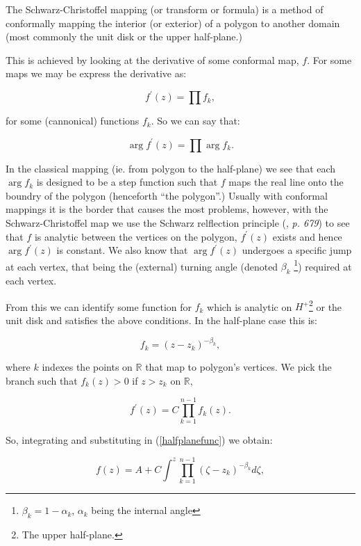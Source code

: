 \documentclass[a4paper,10pt]{amsart}
\newcommand{\sch}{Schwarz-Christoffel }
\newcommand{\fprime}{f^\prime(z)}
\begin{document}
The \sch mapping (or transform or formula) is a method of conformally mapping the interior (or exterior) of a polygon to another domain (most commonly the unit disk or the upper half-plane.)

This is achieved by looking at the derivative of some conformal map, $f$. For some maps we may be express the derivative as:

\begin{equation}
\fprime = \prod f_k,
\end{equation}

for some (cannonical) functions $f_k$. So we can say that:

\begin{equation}
\arg \fprime = \prod \arg f_k.
\end{equation}

In the classical mapping (ie. from polygon to the half-plane) we see that each $\arg f_k$ is designed to be a step function such that $f$ maps the real line onto the boundry of the polygon (henceforth ``the polygon''.) Usually with conformal mappings it is the border that causes the most problems, however, with the \sch map we use the Schwarz relflection principle (\cite{handbuch}, \emph{p. 679}) to see that $f$ is analytic between the vertices on the polygon, $\fprime$ exists and hence $\arg \fprime$ is constant. We also know that $\arg \fprime$ undergoes a specific jump at each vertex, that being the (external) turning angle (denoted $\beta_k$ \footnote{$\beta_k = 1-\alpha_k$, $\alpha_k$ being the internal angle}) required at each vertex. 

From this we can identify some function for $f_k$ which is analytic on $H^+$\footnote{The upper half-plane.} or the unit disk and satisfies the above conditions. In the half-plane case this is:

\begin{equation}
\label{halfplanefunc}
f_k = (z-z_k)^{-\beta_k},
\end{equation}

where $k$ indexes the points on $\mathbb{R}$ that map to polygon's vertices. We pick the branch such that $f_k(z)>0$ if $z>z_k$ on $\mathbb{R}$,

\begin{equation}
\fprime = C \prod_{k=1}^{n-1} f_k(z).
\end{equation}

So, integrating and substituting in (\ref{halfplanefunc}) we obtain:

\begin{equation}
f(z) = A + C \int^z \prod_{k=1}^{n-1} (\zeta-z_k)^{-\beta_k} d\zeta,
\end{equation}
\end{document}
